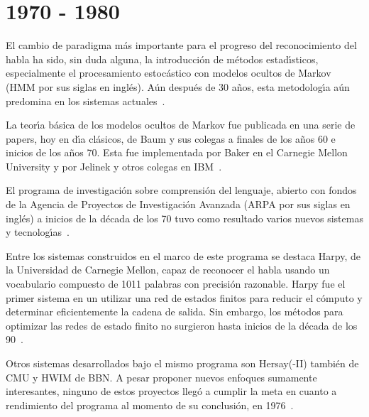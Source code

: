 \section{1970 - 1980}
\label{sec:70s}

El cambio de paradigma m\'as importante para el progreso del reconocimiento del habla ha sido, sin duda alguna,
la introducci\'on de m\'etodos estad{\'\i}sticos, especialmente el procesamiento estoc\'astico con modelos ocultos de
Markov (HMM por sus siglas en ingl\'es). A\'un despu\'es de 30 a\~nos, esta metodolog{\'\i}a a\'un predomina en los
sistemas \mbox{actuales \cite{BakerResearch2009}}.

La teor{\'\i}a b\'asica de los modelos ocultos de Markov fue publicada en una serie de papers, hoy en d{\'\i}a cl\'asicos,
de Baum y sus colegas a finales de los a\~nos 60 e inicios de los a\~nos 70. Esta fue implementada por Baker en
el Carnegie Mellon University y por Jelinek y otros colegas en \mbox{IBM \cite{Rabiner89atutorial}}.

El programa de investigaci\'on sobre comprensi\'on del lenguaje, abierto con fondos de la Agencia de Proyectos de Investigaci\'on Avanzada (ARPA por sus siglas en ingl\'es) a inicios de la d\'ecada de los 70 tuvo como 
resultado varios nuevos sistemas y \mbox{tecnolog{\'\i}as \cite{Furui50Years2004}}.

Entre los sistemas construidos en el marco de este programa se destaca Harpy, de la Universidad de Carnegie Mellon,
capaz de reconocer el habla usando un vocabulario compuesto de 1011 palabras con precisi\'on razonable. Harpy fue el
primer sistema en un utilizar una red de estados finitos para reducir el c\'omputo y determinar eficientemente la
cadena de salida. Sin embargo, los m\'etodos para optimizar las redes de estado finito no surgieron hasta inicios de
la d\'ecada de los \mbox{90 \cite{JuangAutomaticSpeech}}.

Otros sistemas desarrollados bajo el mismo programa son Hersay(-II) tambi\'en de CMU y HWIM de BBN. A pesar proponer
nuevos enfoques sumamente interesantes, ninguno de estos proyectos lleg\'o a cumplir la meta en cuanto a rendimiento
del programa al momento de su conclusi\'on, en \mbox{1976 \cite{JuangAutomaticSpeech}}.